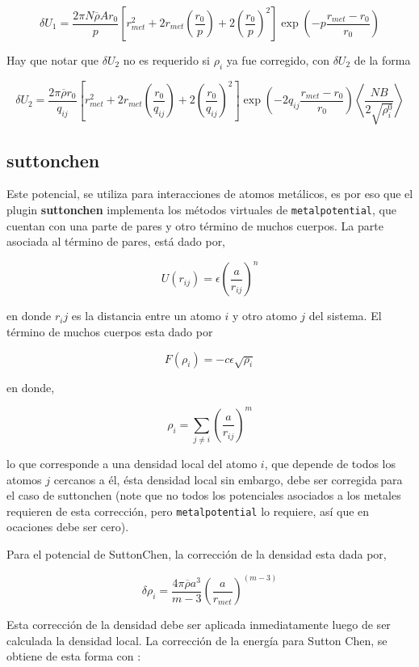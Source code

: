 $$\delta U_1 = \frac{2\pi N\overline{\rho}A
r_0}{p}\left[r^2_{met}+2r_{met}\left(\frac{r_0}{p}\right)+2\left(\frac{r_0}{p}
\right)^2\right]\exp{\left(-p\frac{r_{met}-r_0}{r_0}\right)}$$

Hay que notar que $\delta U_2$ no es requerido si $\rho_i$ ya fue corregido, con
$\delta U_2$ de la forma

$$\delta U_2 = \frac{2\pi\overline{\rho}
r_0}{q_{ij}}\left[r^2_{met}+2r_{met}\left(\frac{r_0}{q_{ij}}\right)+2\left(\frac
{r_0}{q_{ij}}\right)^2\right]\exp{\left(-2q_{ij}\frac{r_{met}-r_0}{r_0}\right)}
\left<\frac{NB}{2\sqrt{\rho_i^0}}\right>$$


\subsection{suttonchen}
Este potencial, se utiliza para interacciones de atomos met\'alicos, es por eso
que el plugin \textbf{suttonchen} implementa los m\'etodos virtuales de
\verb|metalpotential|, que cuentan con una parte de pares y otro t\'ermino de
muchos cuerpos. La parte asociada al t\'ermino de pares, est\'a dado por,

$$U(r_{ij}) = \epsilon\left(\frac{a}{r_{ij}}\right)^n$$

en donde $r_ij$ es la distancia entre un atomo $i$ y otro atomo $j$ del sistema.
El t\'ermino de muchos cuerpos esta dado por

$$F(\rho_{i}) = -c\epsilon\sqrt{\rho_i}$$

en donde,

$$\rho_i = \sum_{j\neq i} \left(\frac{a}{r_{ij}}\right)^m$$

lo que corresponde a una densidad local del atomo $i$, que depende de todos los
atomos $j$ cercanos a \'el, \'esta densidad local sin embargo, debe ser
corregida para el caso de suttonchen (note que no todos los potenciales
asociados a los metales requieren de esta correcci\'on, pero
\verb|metalpotential| lo requiere, as\'i que en ocaciones debe ser cero).

Para el potencial de SuttonChen, la correcci\'on de la densidad esta dada por,

$$\delta\rho_i=\frac{4\pi\overline{\rho}a^3}{m-3}\left(\frac{a}{r_{met}}\right)^
{(m-3)}$$

Esta correcci\'on de la densidad debe ser aplicada inmediatamente luego de ser
calculada la densidad local. La correcci\'on de la energ\'ia para Sutton Chen,
se obtiene de esta forma con :

